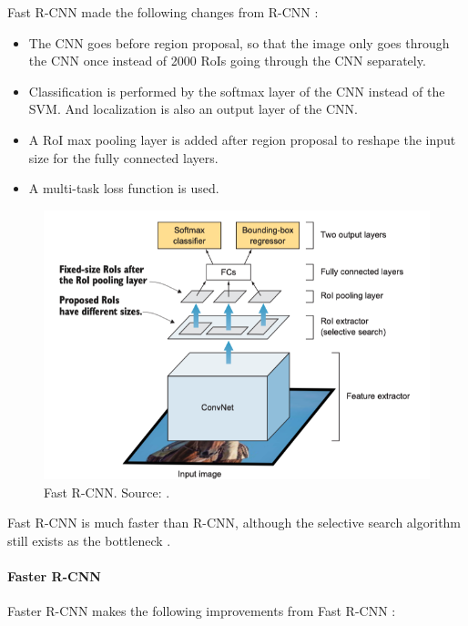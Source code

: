 \documentclass[a4paper, 11pt, oneside]{article}
\begin{document}
Fast R-CNN made the following changes from R-CNN \cite{elgendy2020deep, girshick2015fast}:

\begin{itemize}
  \item The CNN goes before region proposal, so that the image only goes through the CNN once instead
  of 2000 RoIs going through the CNN separately.
  \item Classification is performed by the softmax layer of the CNN instead of the SVM. And localization is also an output
  layer of the CNN.
  \item A RoI max pooling layer is added after region proposal to reshape the input size for the fully connected layers.
  \item A multi-task loss function is used.
\end{itemize}

\begin{figure}[ht]
  \begin{center}
    \includegraphics[width=.8\textwidth]{fast_r_cnn.png}
  \end{center}
  \caption{Fast R-CNN. Source: \cite{elgendy2020deep}.}
\end{figure}

Fast R-CNN is much faster than R-CNN, although the selective search algorithm still exists as the bottleneck
\cite{elgendy2020deep, girshick2015fast, ren2015faster}.

\paragraph{Faster R-CNN}

Faster R-CNN makes the following improvements from Fast R-CNN \cite{elgendy2020deep, ren2015faster}:
\end{document}
